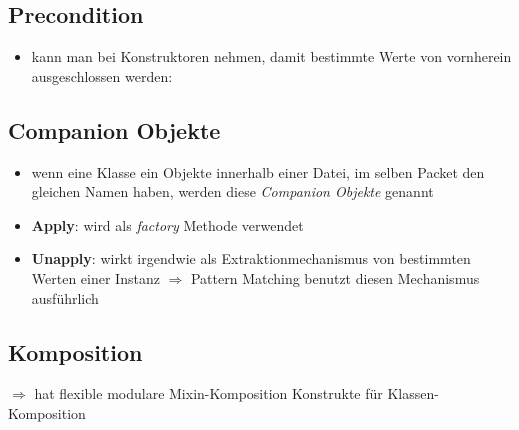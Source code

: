 \subsection{Precondition}
\begin{itemize}
  \item kann man bei Konstruktoren nehmen, damit bestimmte Werte von vornherein
  ausgeschlossen werden:
  
  
\end{itemize}


\subsection{Companion Objekte}
\begin{itemize}
  \item wenn eine Klasse \und ein Objekte innerhalb einer Datei, im selben
  Packet den gleichen Namen haben, werden diese \textit{Companion Objekte}
  genannt
  \item \textbf{Apply}: wird als \textit{factory} Methode verwendet
  
  
  
  \item \textbf{Unapply}: wirkt irgendwie als Extraktionmechanismus von
  bestimmten Werten einer Instanz $\Rightarrow$ Pattern Matching
  benutzt diesen Mechanismus ausführlich
  
  
\end{itemize}


\subsection{Komposition}
$\Rightarrow$ hat flexible modulare Mixin-Komposition Konstrukte für 
Klassen-Komposition


